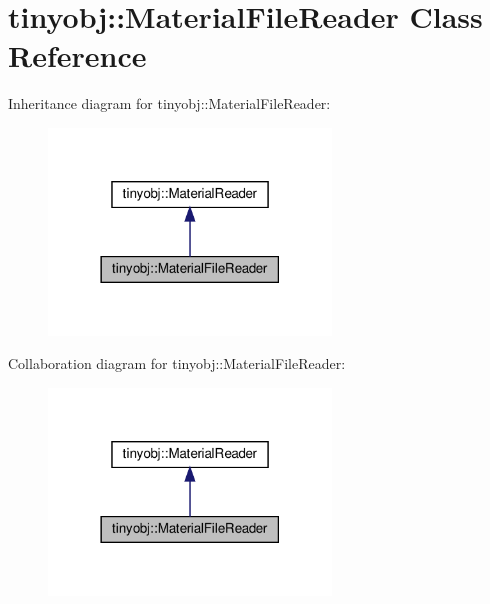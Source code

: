 \hypertarget{classtinyobj_1_1MaterialFileReader}{}\section{tinyobj\+:\+:Material\+File\+Reader Class Reference}
\label{classtinyobj_1_1MaterialFileReader}


Inheritance diagram for tinyobj\+:\+:Material\+File\+Reader\+:
\nopagebreak
\begin{figure}[H]
\begin{center}
\leavevmode
\includegraphics[width=213pt]{classtinyobj_1_1MaterialFileReader__inherit__graph}
\end{center}
\end{figure}


Collaboration diagram for tinyobj\+:\+:Material\+File\+Reader\+:
\nopagebreak
\begin{figure}[H]
\begin{center}
\leavevmode
\includegraphics[width=213pt]{classtinyobj_1_1MaterialFileReader__coll__graph}
\end{center}
\end{figure}
